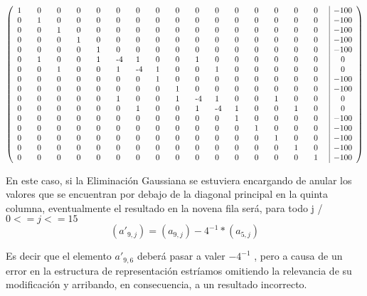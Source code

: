 \documentclass[double, 1.5in, 12pt]{beavtex}
\begin{document}
$
\left(
       \begin{array}{p{5mm}p{5mm}p{5mm}p{5mm}p{5mm}p{5mm}p{5mm}p{5mm}p{5mm}p{5mm}p{5mm}p{5mm}p{5mm}p{5mm}p{5mm}p{5mm}|c}
 1 & 0 & 0 & 0 & 0 & 0 & 0 & 0  & 0 & 0 & 0 & 0 & 0 & 0 & 0 & 0 & -100  \\
 0 & 1 & 0 & 0 & 0 & 0 & 0 & 0  & 0 & 0 & 0 & 0 & 0 & 0 & 0 & 0 & -100  \\
 0 & 0 & 1 & 0 & 0 & 0 & 0 & 0  & 0 & 0 & 0 & 0 & 0 & 0 & 0 & 0 & -100  \\
 0 & 0 & 0 & 1 & 0 & 0 & 0 & 0  & 0 & 0 & 0 & 0 & 0 & 0 & 0 & 0 & -100  \\
 0 & 0 & 0 & 0 & 1 & 0 & 0 & 0  & 0 & 0 & 0 & 0 & 0 & 0 & 0 & 0 & -100  \\
 0 & 1 & 0 & 0 & 1 & -4 & 1 & 0  & 0 & 1 & 0 & 0 & 0 & 0 & 0 & 0 & 0  \\
 0 & 0 & 1 & 0 & 0 & 1 & -4 & 1  & 0 & 0 & 1 & 0 & 0 & 0 & 0 & 0 & 0  \\
 0 & 0 & 0 & 0 & 0 & 0 & 0 & 1  & 0 & 0 & 0 & 0 & 0 & 0 & 0 & 0 & -100  \\
 0 & 0 & 0 & 0 & 0 & 0 & 0 & 0  & 1 & 0 & 0 & 0 & 0 & 0 & 0 & 0 & -100  \\
 0 & 0 & 0 & 0 & 0 & 1 &  0 & 0  & 1 & -4 & 1 & 0 & 0 & 1 & 0 & 0 & 0  \\
 0 & 0 & 0 & 0 & 0 & 0 & 1 & 0  & 0 & 1 & -4 & 1 & 0 & 0 & 1 & 0 & 0  \\
 0 & 0 & 0 & 0 & 0 & 0 & 0 & 0  & 0 & 0 & 0 & 1 & 0 & 0 & 0 & 0 & -100  \\
 0 & 0 & 0 & 0 & 0 & 0 & 0 & 0  & 0 & 0 & 0 & 0 & 1 & 0 & 0 & 0 & -100  \\
 0 & 0 & 0 & 0 & 0 & 0 & 0 & 0  & 0 & 0 & 0 & 0 & 0 & 1 & 0 & 0 & -100  \\
 0 & 0 & 0 & 0 & 0 & 0 & 0 & 0  & 0 & 0 & 0 & 0 & 0 & 0 & 1 & 0 & -100  \\
 0 & 0 & 0 & 0 & 0 & 0 & 0 & 0  & 0 & 0 & 0 & 0 & 0 & 0 & 0 & 1 & -100  \\
       \end{array}
\right)
$

\emptyline
En este caso, si la Eliminaci\'on Gaussiana se estuviera encargando de anular los valores que se encuentran por debajo de la diagonal principal en la quinta columna, eventualmente el resultado en la novena fila ser\'a, para todo j / $ 0<=j<=15$  \begin{equation}
(a'_{9,j}) = (a_{9,j}) - 4^{-1}*(a_{5,j})
\end{equation}

Es decir que el elemento $a'_{9,6}$ deber\'a pasar a valer $-4^{-1}$ , pero a causa de un error en la estructura de representaci\'on estr\'iamos omitiendo la relevancia de su modificaci\'on y arribando, en consecuencia, a un resultado incorrecto.
\end{document}
